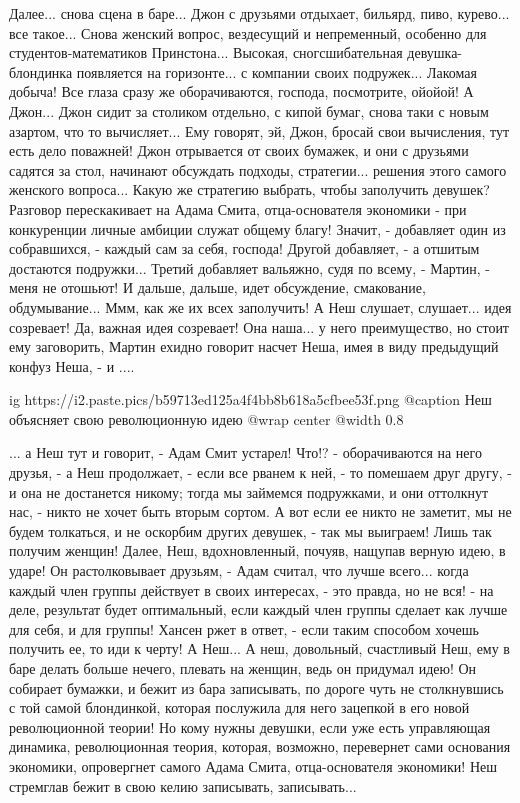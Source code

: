 Далее... снова сцена в баре... Джон с друзьями отдыхает, бильярд, пиво,
курево... все такое...  Снова женский вопрос, вездесущий и непременный,
особенно для студентов-математиков Принстона...  Высокая, сногсшибательная
девушка-блондинка появляется на горизонте... с компании своих подружек...
Лакомая добыча! Все глаза сразу же оборачиваются, господа, посмотрите, ойойой!
А Джон... Джон сидит за столиком отдельно, с кипой бумаг, снова таки с новым
азартом, что то вычисляет... Ему говорят, эй, Джон, бросай свои вычисления, тут
есть дело поважней! Джон отрывается от своих бумажек, и они с друзьями садятся
за стол, начинают обсуждать подходы, стратегии... решения этого самого женского
вопроса...  Какую же стратегию выбрать, чтобы заполучить девушек?  Разговор
перескакивает на Адама Смита, отца-основателя экономики - при конкуренции
личные амбиции служат общему благу!  Значит, - добавляет один из собравшихся, -
каждый сам за себя, господа! Другой добавляет, - а отшитым достаются
подружки... Третий добавляет вальяжно, судя по всему, - Мартин, - меня не
отошьют! И дальше, дальше, идет обсуждение, смакование, обдумывание... Ммм, как
же их всех заполучить!  А Неш слушает, слушает... идея созревает! Да, важная
идея созревает! Она наша... у него преимущество, но стоит ему заговорить,
Мартин ехидно говорит насчет Неша, имея в виду предыдущий конфуз Неша, - и ....

\ifcmt
  ig https://i2.paste.pics/b59713ed125a4f4bb8b618a5cfbee53f.png
  @caption Неш объясняет свою революционную идею
  @wrap center
  @width 0.8
\fi

... а Неш тут и говорит, - Адам Смит устарел! Что!? - оборачиваются на него
друзья, - а Неш продолжает, - если все рванем к ней, - то помешаем друг другу,
- и она не достанется никому; тогда мы займемся подружками, и они оттолкнут
нас, - никто не хочет быть вторым сортом. А вот если ее никто не заметит, мы не
будем толкаться, и не оскорбим других девушек, - так мы выиграем! Лишь так
получим женщин! Далее, Неш, вдохновленный, почуяв, нащупав верную идею, в
ударе!  Он растолковывает друзьям, - Адам считал, что лучше всего... когда
каждый член группы действует в своих интересах, - это правда, но не вся! - на
деле, результат будет оптимальный, если каждый член группы сделает как лучше
для себя, и для группы! Хансен ржет в ответ, - если таким способом хочешь
получить ее, то иди к черту! А Неш... А неш, довольный, счастливый Неш, ему в
баре делать больше нечего, плевать на женщин, ведь он придумал идею! Он
собирает бумажки, и бежит из бара записывать, по дороге чуть не столкнувшись с
той самой блондинкой, которая послужила для него зацепкой в его новой
революционной теории! Но кому нужны девушки, если уже есть управляющая
динамика, революционная теория, которая, возможно, перевернет сами основания
экономики, опровергнет самого Адама Смита, отца-основателя экономики! Неш
стремглав бежит в свою келию записывать, записывать...

